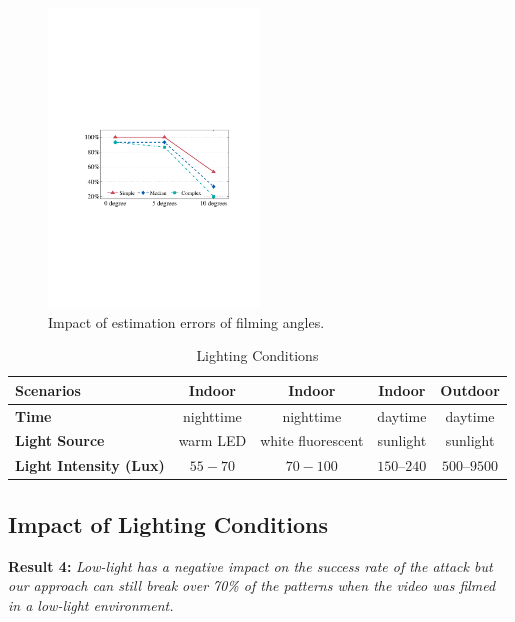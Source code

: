      \begin{figure}[!t]
        \centering
        \includegraphics[width=0.5\textwidth]{fig/15.pdf}
        \caption{Impact of estimation errors of filming angles.}
        \label{fig:fig15}
    \end{figure}

       \begin{table}[!t]
            \centering
            \caption{Lighting Conditions}
            \label{tab:light}
            \scriptsize
            \begin{tabular}{lcccc}
                \toprule
                \textbf{Scenarios} & Indoor  & Indoor & Indoor  & Outdoor\\
                \midrule
                \textbf{Time} & nighttime &  nighttime & daytime & daytime \\
                \textbf{Light Source}& warm LED & white fluorescent & sunlight &  sunlight \\
                \textbf{Light Intensity (Lux)} & $55-70$ & $70-100$ & $150$--$240$ & $500$--$9500$ \\
                \bottomrule
            \end{tabular}
        \end{table}

    \subsection{Impact of Lighting Conditions \label{sec:light}}
    \noindent \textbf{Result 4:} \emph{Low-light has a negative impact on the success rate of the attack but our approach can still break over 70\% of the patterns when the video was filmed in a low-light environment.}

